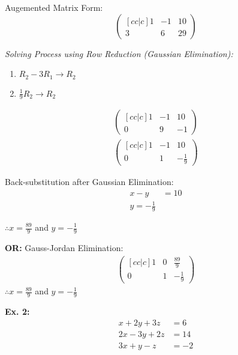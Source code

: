 \noindent
\newline
Augemented Matrix Form:
\begin{equation}
    \begin{pmatrix}[cc|c]
      1 & -1 & 10 \\
      3 & 6 & 29
    \end{pmatrix}
\end{equation}

\noindent
\newline
\textit{Solving Process using Row Reduction (Gaussian Elimination):}
\begin{enumerate}
    \item \(R_2 - 3R_1 \rightarrow R_2\)
    \item \(\frac{1}{9}R_2 \rightarrow R_2\)
\end{enumerate}

\begin{align}
    \begin{pmatrix}[cc|c]
      1 & -1 & 10 \\
      0 & 9 & -1
    \end{pmatrix} \\
    \begin{pmatrix}[cc|c]
      1 & -1 & 10 \\
      0 & 1 & -\frac{1}{9}
    \end{pmatrix}
\end{align}
\newline

\noindent
\newline
Back-substitution after Gaussian Elimination:
\begin{align}
    x-y &= 10 \\
    y = -\frac{1}{9}
\end{align}

\noindent
\(\therefore x=\frac{89}{9}\) and \(y=-\frac{1}{9}\)

\noindent
\newline
\textbf{OR:} Gauss-Jordan Elimination:
\begin{align}
    \begin{pmatrix}[cc|c]
      1 & 0 & \frac{89}{9} \\
      0 & 1 & -\frac{1}{9}
    \end{pmatrix}
\end{align}
\newline
\noindent
\(\therefore x=\frac{89}{9}\) and \(y=-\frac{1}{9}\)


\noindent
\textbf{Ex. 2:}
\begin{align}
    x + 2y + 3z &= 6 \\
    2x -3y + 2z &=14 \\
    3x + y -z &= -2
\end{align}

